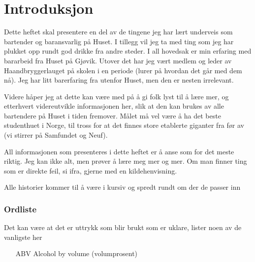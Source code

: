 \chapter*{Introduksjon}
\label{Chap:intro}

Dette heftet skal presentere en del av de tingene jeg har lært underveis som bartender og baransvarlig på Huset. I tillegg vil jeg ta med ting som jeg har plukket opp rundt god drikke fra andre steder. I all hovedsak er min erfaring med bararbeid fra Huset på Gjøvik. Utover det har jeg vært medlem og leder av Haandbryggerlauget på skolen i en periode (lurer på hvordan det går med dem nå). Jeg har litt barerfaring fra utenfor Huset, men den er nesten irrelevant. 

Videre håper jeg at dette kan være med på å gi folk lyst til å lære mer, og etterhvert videreutvikle informasjonen her, slik at den kan brukes av alle bartendere på Huset i tiden fremover. Målet må vel være å ha det beste studenthuet i Norge, til tross for at det finnes store etablerte giganter fra før av (vi stirrer på Samfundet og Neuf).

All informasjonen som presenteres i dette heftet er å anse som for det meste riktig. Jeg kan ikke alt, men prøver å lære meg mer og mer. Om man finner ting som er direkte feil, si ifra, gjerne med en kildehenvisning.

Alle historier kommer til å være i kursiv og spredt rundt om der de passer inn

\subsection*{Ordliste}
Det kan være at det er uttrykk som blir brukt som er uklare, lister noen av de vanligste her
\begin{itemize}
    \item[ABV] Alcohol by volume (volumprosent)
\end{itemize}